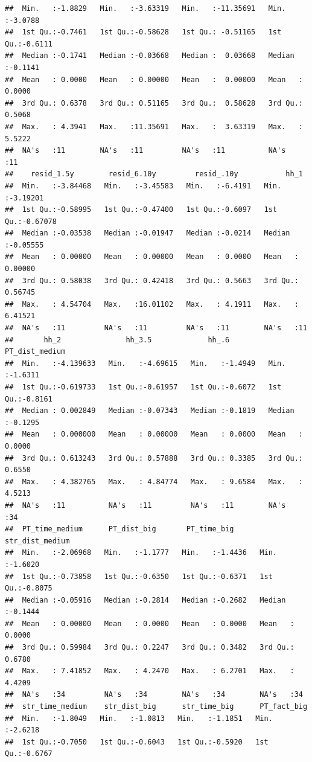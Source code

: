 \documentclass[
]{article}
\begin{document}
\begin{verbatim}
##  Min.   :-1.8829   Min.   :-3.63319   Min.   :-11.35691   Min.   :-3.0788  
##  1st Qu.:-0.7461   1st Qu.:-0.58628   1st Qu.: -0.51165   1st Qu.:-0.6111  
##  Median :-0.1741   Median :-0.03668   Median :  0.03668   Median :-0.1141  
##  Mean   : 0.0000   Mean   : 0.00000   Mean   :  0.00000   Mean   : 0.0000  
##  3rd Qu.: 0.6378   3rd Qu.: 0.51165   3rd Qu.:  0.58628   3rd Qu.: 0.5068  
##  Max.   : 4.3941   Max.   :11.35691   Max.   :  3.63319   Max.   : 5.5222  
##  NA's   :11        NA's   :11         NA's   :11          NA's   :11       
##    resid_1.5y        resid_6.10y         resid_.10y           hh_1         
##  Min.   :-3.84468   Min.   :-3.45583   Min.   :-6.4191   Min.   :-3.19201  
##  1st Qu.:-0.58995   1st Qu.:-0.47400   1st Qu.:-0.6097   1st Qu.:-0.67078  
##  Median :-0.03538   Median :-0.01947   Median :-0.0214   Median :-0.05555  
##  Mean   : 0.00000   Mean   : 0.00000   Mean   : 0.0000   Mean   : 0.00000  
##  3rd Qu.: 0.58038   3rd Qu.: 0.42418   3rd Qu.: 0.5663   3rd Qu.: 0.56745  
##  Max.   : 4.54704   Max.   :16.01102   Max.   : 4.1911   Max.   : 6.41521  
##  NA's   :11         NA's   :11         NA's   :11        NA's   :11        
##       hh_2               hh_3.5             hh_.6         PT_dist_medium   
##  Min.   :-4.139633   Min.   :-4.69615   Min.   :-1.4949   Min.   :-1.6311  
##  1st Qu.:-0.619733   1st Qu.:-0.61957   1st Qu.:-0.6072   1st Qu.:-0.8161  
##  Median : 0.002849   Median :-0.07343   Median :-0.1819   Median :-0.1295  
##  Mean   : 0.000000   Mean   : 0.00000   Mean   : 0.0000   Mean   : 0.0000  
##  3rd Qu.: 0.613243   3rd Qu.: 0.57888   3rd Qu.: 0.3385   3rd Qu.: 0.6550  
##  Max.   : 4.382765   Max.   : 4.84774   Max.   : 9.6584   Max.   : 4.5213  
##  NA's   :11          NA's   :11         NA's   :11        NA's   :34       
##  PT_time_medium      PT_dist_big       PT_time_big      str_dist_medium  
##  Min.   :-2.06968   Min.   :-1.1777   Min.   :-1.4436   Min.   :-1.6020  
##  1st Qu.:-0.73858   1st Qu.:-0.6350   1st Qu.:-0.6371   1st Qu.:-0.8075  
##  Median :-0.05916   Median :-0.2814   Median :-0.2682   Median :-0.1444  
##  Mean   : 0.00000   Mean   : 0.0000   Mean   : 0.0000   Mean   : 0.0000  
##  3rd Qu.: 0.59984   3rd Qu.: 0.2247   3rd Qu.: 0.3482   3rd Qu.: 0.6780  
##  Max.   : 7.41852   Max.   : 4.2470   Max.   : 6.2701   Max.   : 4.4209  
##  NA's   :34         NA's   :34        NA's   :34        NA's   :34       
##  str_time_medium    str_dist_big      str_time_big      PT_fact_big     
##  Min.   :-1.8049   Min.   :-1.0813   Min.   :-1.1851   Min.   :-2.6218  
##  1st Qu.:-0.7050   1st Qu.:-0.6043   1st Qu.:-0.5920   1st Qu.:-0.6767  

\end{verbatim}
\end{document}
